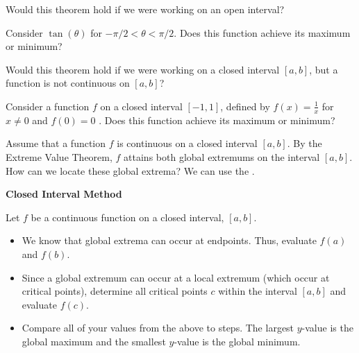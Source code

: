 \documentclass{ximera}
\begin{document}
\begin{question}
  Would this theorem hold if we were working on an open interval?
  \begin{prompt}
  \begin{multipleChoice}
  \end{multipleChoice}
  \begin{hint}
    Consider $\tan(\theta)$ for $-\pi/2 < \theta < \pi/2$. Does this function achieve its maximum or minimum? 
  \end{hint}
  \end{prompt}
  \end{question}

\begin{question}%
  Would this theorem hold if we were working on a closed interval
  $[a,b]$, but a function is not continuous on $[a,b]$?
  \begin{prompt}
    \begin{multipleChoice}
    \end{multipleChoice}
    \begin{hint}
      Consider a function $f$ on a closed interval $[-1,1]$, defined
      by $f(x)=\frac{1}{x}$ for $x\neq 0$ and $f(0)=0$ . Does this
      function achieve its maximum or minimum?
    \end{hint}
  \end{prompt}
\end{question}
Assume that a function $f$ is continuous on a closed interval
$[a,b]$. By the Extreme Value Theorem, $f$ attains both global
extremums on the interval $[a,b]$.  How can we locate these global
extrema? We can use the . 

\begin{center}
    \textbf{Closed Interval Method}
\end{center}

Let $f$ be a continuous function on a closed interval, $[a,b]$.
\begin{itemize}
    \item We know that global extrema can occur at  endpoints. Thus, evaluate $f(a)$ and $f(b)$.
    \item Since a global extremum can occur at a local extremum (which occur at critical points), determine all critical points $c$ within the interval $[a,b]$ and evaluate $f(c)$.
    \item Compare all of your values from the above to steps. The largest $y$-value is the global maximum and the smallest $y$-value is the global minimum. 
\end{itemize}
\end{document}
